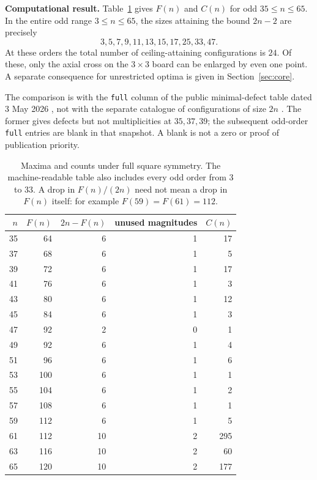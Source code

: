\documentclass[11pt]{article}
\newcommand{\lastorder}{65}
\begin{document}
\textbf{Computational result.} Table~\ref{tab:results} gives $F(n)$ and $C(n)$ for odd $35\le n\le\lastorder$. In the entire odd range $3\le n\le\lastorder$, the sizes attaining the bound $2n-2$ are precisely
\[
3,5,7,9,11,13,15,17,25,33,47.
\]
At these orders the total number of ceiling-attaining configurations is $24$. Of these, only the axial cross on the $3\times3$ board can be enlarged by even one point. A separate consequence for unrestricted optima is given in Section~\ref{sec:core}.

The comparison is with the \texttt{full} column of the public minimal-defect table dated 3 May 2026 \cite{defects}, not with the separate catalogue of configurations of size $2n$ \cite{catalogue}. The former gives defects but not multiplicities at $35,37,39$; the subsequent odd-order \texttt{full} entries are blank in that snapshot. A blank is not a zero or proof of publication priority.

\begin{table}[ht]
\centering
\begin{tabular}{r r r r r}
\toprule
$n$ & $F(n)$ & $2n-F(n)$ & unused magnitudes & $C(n)$\\
\midrule
35 & 64 & 6 & 1 & 17 \\
37 & 68 & 6 & 1 & 5 \\
39 & 72 & 6 & 1 & 17 \\
41 & 76 & 6 & 1 & 3 \\
43 & 80 & 6 & 1 & 12 \\
45 & 84 & 6 & 1 & 3 \\
47 & 92 & 2 & 0 & 1 \\
49 & 92 & 6 & 1 & 4 \\
51 & 96 & 6 & 1 & 6 \\
53 & 100 & 6 & 1 & 1 \\
55 & 104 & 6 & 1 & 2 \\
57 & 108 & 6 & 1 & 1 \\
59 & 112 & 6 & 1 & 5 \\
61 & 112 & 10 & 2 & 295 \\
63 & 116 & 10 & 2 & 60 \\
65 & 120 & 10 & 2 & 177 \\
\bottomrule
\end{tabular}
\caption{Maxima and counts under full square symmetry. The machine-readable table also includes every odd order from 3 to 33. A drop in $F(n)/(2n)$ need not mean a drop in $F(n)$ itself: for example $F(59)=F(61)=112$.}\label{tab:results}
\end{table}
\end{document}
